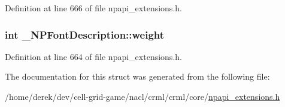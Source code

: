 Definition at line 666 of file npapi\_\-extensions.h.

\hypertarget{struct___n_p_font_description_ab23cb8515f8fb97a71c2114706284361}{
\subsubsection[{weight}]{\setlength{\rightskip}{0pt plus 5cm}int {\bf \_\-NPFontDescription::weight}}}
\label{struct___n_p_font_description_ab23cb8515f8fb97a71c2114706284361}


Definition at line 664 of file npapi\_\-extensions.h.



The documentation for this struct was generated from the following file:\begin{DoxyCompactItemize}
\item 
/home/derek/dev/cell-\/grid-\/game/nacl/crml/crml/core/\hyperlink{npapi__extensions_8h}{npapi\_\-extensions.h}\end{DoxyCompactItemize}
